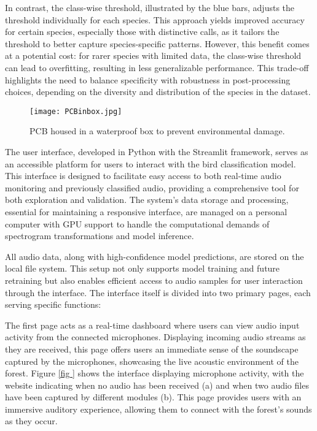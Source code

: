 In contrast, the class-wise threshold, illustrated by the blue bars, adjusts the threshold individually for each species. This approach yields improved accuracy for certain species, especially those with distinctive calls, as it tailors the threshold to better capture species-specific patterns. However, this benefit comes at a potential cost: for rarer species with limited data, the class-wise threshold can lead to overfitting, resulting in less generalizable performance. This trade-off highlights the need to balance specificity with robustness in post-processing choices, depending on the diversity and distribution of the species in the dataset.

\begin{figure}[h]
    \centering
    \texttt{[image: PCBinbox.jpg]}
    \caption{PCB housed in a waterproof box to prevent environmental damage.}
    \vspace{0.1cm}
    \label{fig:pcb_box}
\end{figure}


The user interface, developed in Python with the Streamlit framework, serves as an accessible platform for users to interact with the bird classification model. This interface is designed to facilitate easy access to both real-time audio monitoring and previously classified audio, providing a comprehensive tool for both exploration and validation. The system’s data storage and processing, essential for maintaining a responsive interface, are managed on a personal computer with GPU support to handle the computational demands of spectrogram transformations and model inference.

All audio data, along with high-confidence model predictions, are stored on the local file system. This setup not only supports model training and future retraining but also enables efficient access to audio samples for user interaction through the interface. The interface itself is divided into two primary pages, each serving specific functions:

The first page acts as a real-time dashboard where users can view audio input activity from the connected microphones. Displaying incoming audio streams as they are received, this page offers users an immediate sense of the soundscape captured by the microphones, showcasing the live acoustic environment of the forest. Figure \ref{fig
} shows the interface displaying microphone activity, with the website indicating when no audio has been received (a) and when two audio files have been captured by different modules (b). This page provides users with an immersive auditory experience, allowing them to connect with the forest’s sounds as they occur.

